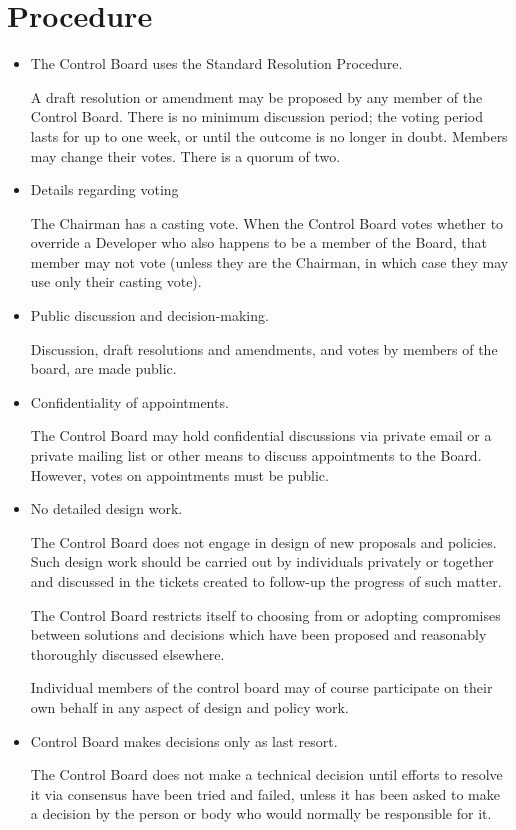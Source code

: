 \documentclass[]{article}
\begin{document}
\section{Procedure}
\begin{itemize}

\item The Control Board uses the Standard Resolution Procedure.

    A draft resolution or amendment may be proposed by any member of the Control Board. There is no minimum discussion period; the voting period lasts for up to one week, or until the outcome is no longer in doubt. Members may change their votes. There is a quorum of two.

\item Details regarding voting

    The Chairman has a casting vote. When the Control Board votes whether to override a Developer who also happens to be a member of the Board, that member may not vote (unless they are the Chairman, in which case they may use only their casting vote).

\item Public discussion and decision-making.

    Discussion, draft resolutions and amendments, and votes by members of the board, are made public.

\item Confidentiality of appointments.

    The Control Board may hold confidential discussions via private email or a private mailing list or other means to discuss appointments to the Board. However, votes on appointments must be public.

\item No detailed design work.

    The Control Board does not engage in design of new proposals and policies. Such design work should be carried out by individuals privately or together and discussed in the tickets created to follow-up the progress of such matter.

    The Control Board restricts itself to choosing from or adopting compromises between solutions and decisions which have been proposed and reasonably thoroughly discussed elsewhere.

    Individual members of the control board may of course participate on their own behalf in any aspect of design and policy work.

\item Control Board makes decisions only as last resort.

    The Control Board does not make a technical decision until efforts to resolve it via consensus have been tried and failed, unless it has been asked to make a decision by the person or body who would normally be responsible for it.
    
\end{itemize}
\end{document}
